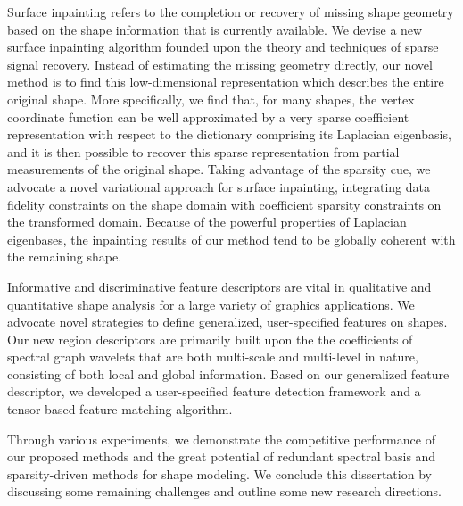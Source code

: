 \documentclass[12pt,letterpaper,twosided]{report}
\numberwithin{equation}{section}
\begin{document}
Surface inpainting refers to the completion or recovery of missing shape geometry
based on the shape information that is currently available. We devise a new surface
inpainting algorithm founded upon the theory and techniques of sparse signal recovery.
Instead of estimating the missing geometry directly, our novel method is to
find this low-dimensional representation which describes the entire
original shape. More specifically, we find that, for many shapes, the
vertex coordinate function can be well approximated by a very sparse coefficient
representation with respect to the dictionary comprising its
Laplacian eigenbasis, and it is then possible to recover this sparse
representation from partial measurements of the original shape.
Taking advantage of the sparsity cue, we advocate a novel
variational approach for surface inpainting, integrating data
fidelity constraints on the shape domain with coefficient sparsity
constraints on the transformed domain. Because of the powerful
properties of Laplacian eigenbases, the inpainting results of our
method tend to be globally coherent with the remaining shape.

Informative and discriminative feature descriptors are vital in
qualitative and quantitative shape analysis for a large variety of
graphics applications. We advocate novel strategies to define generalized,
user-specified features on shapes. Our new region descriptors
are primarily built upon the the coefficients of spectral graph wavelets
that are both multi-scale and multi-level in nature, consisting of both
local and global information. Based on our generalized feature descriptor,
we developed a user-specified feature detection framework and a tensor-based
feature matching algorithm.

Through various experiments, we demonstrate the competitive performance of our
proposed methods and the great potential of redundant spectral basis and sparsity-driven
methods for shape modeling. We conclude this dissertation
by discussing some remaining challenges and outline some new research directions.

\tableofcontents

\clearpage
{}
{}
\listoffigures

\clearpage
{}
{}
\listoftables


\end{document}
